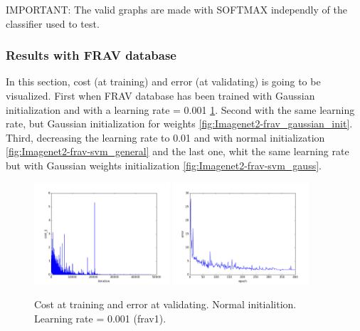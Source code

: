 IMPORTANT: The valid graphs are made with SOFTMAX independly of the classifier used to test.\\

\subsubsection{Results with FRAV database}
In this section, cost (at training) and error (at validating) is going to be visualized. First when FRAV database has been trained with Gaussian initialization and with a learning rate = 0.001 \ref{fig:Imagenet2-frav1}. Second with the same learning rate, but Gaussian initialization for weights \ref{fig:Imagenet2-frav_gaussian_init}. Third, decreasing the learning rate to 0.01 and with normal initialization \ref{fig:Imagenet2-frav-svm_general} and the last one, whit the same learning rate but with Gaussian weights initialization \ref{fig:Imagenet2-frav-svm_gauss}.\\

\begin{figure}[htb]
\centering
\includegraphics[width=0.45\textwidth]{images/FRAv_casia_ImageNet/Imagenet2/frav/frav1/cost_frav.png}
\includegraphics[width=0.45\textwidth]{images/FRAv_casia_ImageNet/Imagenet2/frav/frav1/error_frav.png}
\caption{Cost at training and error at validating. Normal initialition. Learning rate = 0.001 (frav1).} \label{fig:Imagenet2-frav1}
\end{figure}

